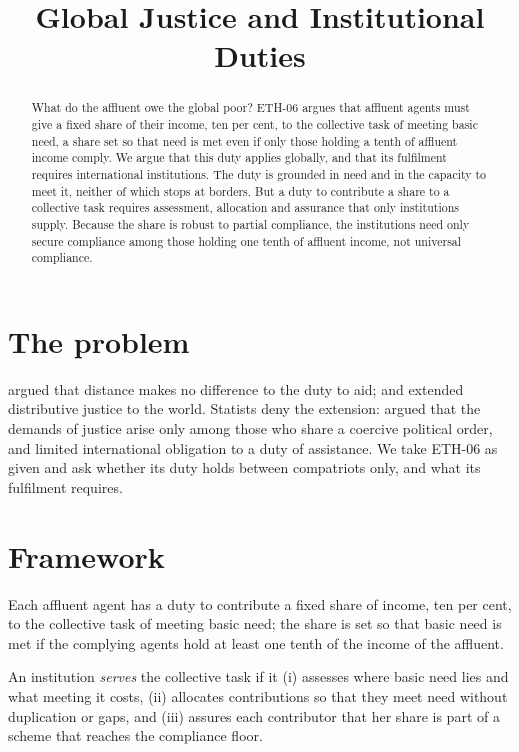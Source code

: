 \documentclass{situationist-preprint}
\title{Global Justice and Institutional Duties}
\begin{document}
\maketitle

\begin{abstract}
What do the affluent owe the global poor? ETH-06 argues that affluent agents must give a fixed share of their income, ten per cent, to the collective task of meeting basic need, a share set so that need is met even if only those holding a tenth of affluent income comply. We argue that this duty applies globally, and that its fulfilment requires international institutions. The duty is grounded in need and in the capacity to meet it, neither of which stops at borders. But a duty to contribute a share to a collective task requires assessment, allocation and assurance that only institutions supply. Because the share is robust to partial compliance, the institutions need only secure compliance among those holding one tenth of affluent income, not universal compliance.
\end{abstract}

\section{The problem}

\citet{Singer1972} argued that distance makes no difference to the duty to aid; \citet{Beitz1979} and \citet{Pogge2002} extended distributive justice to the world. Statists deny the extension: \citet{Nagel2005} argued that the demands of justice arise only among those who share a coercive political order, and \citet{Rawls1999} limited international obligation to a duty of assistance. We take ETH-06 as given and ask whether its duty holds between compatriots only, and what its fulfilment requires.

\section{Framework}

\begin{assumption}\label{a:duty}
Each affluent agent has a duty to contribute a fixed share of income, ten per cent, to the collective task of meeting basic need; the share is set so that basic need is met if the complying agents hold at least one tenth of the income of the affluent.
\end{assumption}

\begin{definition}\label{d:inst}
An institution \emph{serves} the collective task if it (i) assesses where basic need lies and what meeting it costs, (ii) allocates contributions so that they meet need without duplication or gaps, and (iii) assures each contributor that her share is part of a scheme that reaches the compliance floor.
\end{definition}
\end{document}
